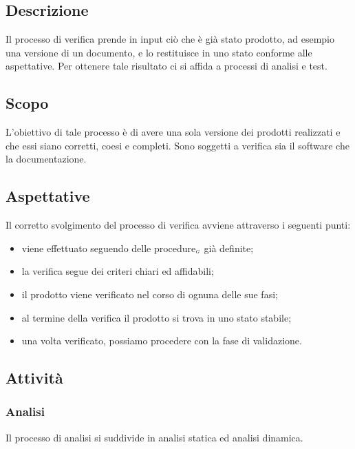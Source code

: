 \subsection{Descrizione}\label{ProcessiDiSupportoVerificaDescrizione}
Il processo di verifica prende in input ciò che è già stato prodotto, ad esempio una versione di un documento, e lo restituisce in uno stato conforme alle aspettative. Per ottenere tale risultato ci si affida a processi di analisi e test.

\subsection{Scopo}\label{ProcessiDiSupportoVerificaScopo}
L'obiettivo di tale processo è di avere una sola versione dei prodotti realizzati e che essi siano corretti, coesi e
completi. Sono soggetti a verifica sia il software che la documentazione.

\subsection{Aspettative}\label{ProcessiDiSupportoVerificaAspettative}
Il corretto svolgimento del processo di verifica avviene attraverso i seguenti punti:
\begin{itemize}
	\item viene effettuato seguendo delle procedure$_{\scaleto{G}{3pt}}$ già definite;
	\item la verifica segue dei criteri chiari ed affidabili;
	\item il prodotto viene verificato nel corso di ognuna delle sue fasi;
	\item al termine della verifica il prodotto si trova in uno stato stabile;
	\item una volta verificato, possiamo procedere con la fase di validazione.
\end{itemize}

\subsection{Attività}\label{ProcessiDiSupportoVerificaAttività}
\subsubsection{Analisi}\label{ProcessiDiSupportoVerificaAttivitàAnalisi}
Il processo di analisi si suddivide in analisi statica ed analisi dinamica.
